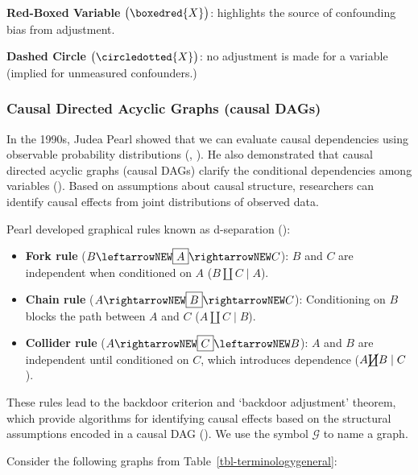 \documentclass[
  single column]{article}
\providecommand{\tightlist}{%
  \setlength{\itemsep}{0pt}\setlength{\parskip}{0pt}}\usepackage{longtable,booktabs,array}
\begin{document}
\textbf{Red-Boxed Variable} \(\big(\boxedred{X}\big)\): highlights the
source of confounding bias from adjustment.

\textbf{Dashed Circle} \(\big( \circledotted{X}\big)\): no adjustment is
made for a variable (implied for unmeasured confounders.)

\subsubsection{Causal Directed Acyclic Graphs (causal
DAGs)}\label{causal-directed-acyclic-graphs-causal-dags}

In the 1990s, Judea Pearl showed that we can evaluate causal
dependencies using observable probability distributions
(, ).
He also demonstrated that causal directed acyclic graphs (causal DAGs)
clarify the conditional dependencies among variables
(). Based on assumptions about
causal structure, researchers can identify causal effects from joint
distributions of observed data.

Pearl developed graphical rules known as d-separation
():

\begin{itemize}
\tightlist
\item
  \textbf{Fork rule} (\(B \leftarrowNEW \boxed{A} \rightarrowNEW C\)):
  \(B\) and \(C\) are independent when conditioned on \(A\)
  (\(B \coprod C \mid A\)).
\item
  \textbf{Chain rule} (\(A \rightarrowNEW \boxed{B} \rightarrowNEW C\)):
  Conditioning on \(B\) blocks the path between \(A\) and \(C\)
  (\(A \coprod C \mid B\)).
\item
  \textbf{Collider rule}
  (\(A \rightarrowNEW \boxed{C} \leftarrowNEW B\)): \(A\) and \(B\) are
  independent until conditioned on \(C\), which introduces dependence
  (\(A \cancel{\coprod} B \mid C\)).
\end{itemize}

These rules lead to the backdoor criterion and `backdoor adjustment'
theorem, which provide algorithms for identifying causal effects based
on the structural assumptions encoded in a causal DAG
(). We use the symbol
\(\mathcal{G}\) to name a graph.

Consider the following graphs from Table~\ref{tbl-terminologygeneral}:
\end{document}
